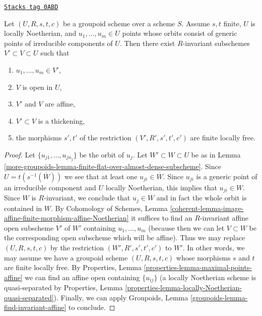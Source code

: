\begin{lemma}
\label{more-groupoids-lemma-invariant-affine-open-around-generic-point-Noetherian}
\href{https://stacks.math.columbia.edu/tag/0ABD}{\texttt{Stacks tag 0ABD}}

Let $(U, R, s, t, c)$ be a groupoid scheme over a scheme $S$.
Assume $s, t$ finite, $U$ is locally Noetherian, and $u_1, \ldots, u_m \in U$
points whose orbits consist of generic points of irreducible
components of $U$. Then there exist $R$-invariant subschemes
$V' \subset V \subset U$ such that
\begin{enumerate}
\item $u_1, \ldots, u_m \in V'$,
\item $V$ is open in $U$,
\item $V'$ and $V$ are affine,
\item $V' \subset V$ is a thickening,
\item the morphisms $s', t'$ of the restriction $(V', R', s', t', c')$
are finite locally free.
\end{enumerate}
\end{lemma}

\begin{proof}
Let $\{u_{j1}, \ldots, u_{jn_j}\}$ be the orbit of $u_j$.
Let $W' \subset W \subset U$ be as in
Lemma \ref{more-groupoids-lemma-finite-flat-over-almost-dense-subscheme}.
Since $U = t(s^{-1}(\overline{W}))$ we see that at least
one $u_{ji} \in \overline{W}$. Since $u_{ji}$ is a generic point
of an irreducible component and $U$ locally Noetherian,
this implies that $u_{ji} \in W$. Since $W$ is $R$-invariant, we
conclude that $u_j \in W$ and in fact the whole orbit is contained in $W$.
By Cohomology of Schemes, Lemma
\ref{coherent-lemma-image-affine-finite-morphism-affine-Noetherian}
it suffices to find an $R$-invariant affine open subscheme $V'$
of $W'$ containing $u_1, \ldots, u_m$ (because then we can let $V \subset W$
be the corresponding open subscheme which will be affine).
Thus we may replace $(U, R, s, t, c)$
by the restriction $(W', R', s', t', c')$ to $W'$.
In other words, we may assume we have a groupoid scheme $(U, R, s, t, c)$
whose morphisms $s$ and $t$ are finite locally free.
By Properties, Lemma \ref{properties-lemma-maximal-points-affine}
we can find an affine open containing $\{u_{ij}\}$
(a locally Noetherian scheme is quasi-separated by
Properties, Lemma \ref{properties-lemma-locally-Noetherian-quasi-separated}).
Finally, we can apply
Groupoids, Lemma \ref{groupoids-lemma-find-invariant-affine}
to conclude.
\end{proof}

